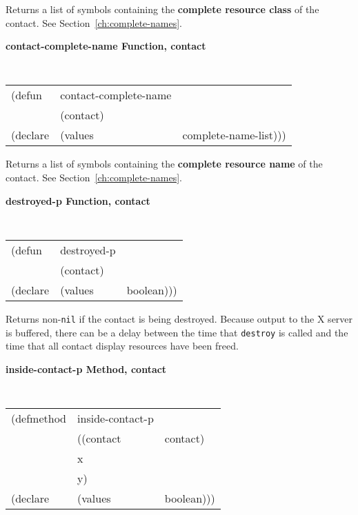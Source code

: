 \begin{flushright} \parbox[t]{6.125in}{
Returns a list of symbols containing the {\bf complete resource class} of the contact.
See Section~\ref{ch:complete-names}.

}\end{flushright}


{\samepage
{\large {\bf contact-complete-name \hfill Function, contact}}
\begin{flushright}
\parbox[t]{6.125in}{
\tt
\begin{tabular}{lll}
\raggedright
(defun & contact-complete-name & \\
& (contact) \\
(declare & (values & complete-name-list)))
\end{tabular}
}\end{flushright}}

\begin{flushright}
\parbox[t]{6.125in}{
Returns a list of symbols containing the {\bf complete resource name} of the contact.
See Section~\ref{ch:complete-names}.
}\end{flushright}


{\samepage
{\large {\bf destroyed-p \hfill Function, contact}} 
\begin{flushright} \parbox[t]{6.125in}{
\tt
\begin{tabular}{lll}
\raggedright
(defun & destroyed-p & \\ 
& (contact) \\
(declare &(values  & boolean)))
\end{tabular}
\rm

}\end{flushright}}

\begin{flushright} \parbox[t]{6.125in}{
Returns non-{\tt nil} if the contact is being destroyed. Because output to the X
server is buffered, there can be a delay between the time that {\tt destroy} is
called and the time that all contact display resources have been freed.

}\end{flushright}



{\samepage
{\large {\bf inside-contact-p \hfill Method, contact}} 
\begin{flushright} \parbox[t]{6.125in}{
\tt
\begin{tabular}{lll}
\raggedright
(defmethod & inside-contact-p & \\ 
& ((contact & contact)\\
&  x\\
&  y) \\
(declare &(values  & boolean)))
\end{tabular}
\rm

}\end{flushright}}

